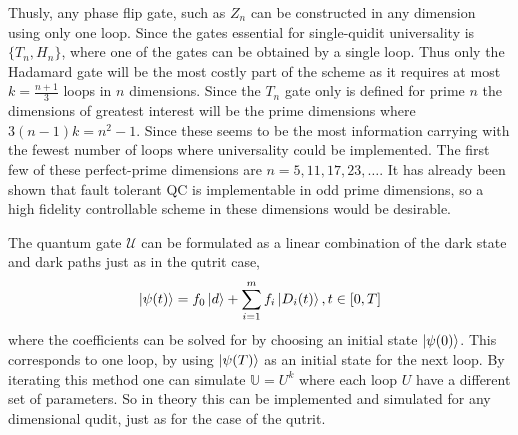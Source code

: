 Thusly, any phase flip gate, such as $Z_n$ can be constructed in any dimension using only one loop. Since the gates essential for single-quidit universality is $\{T_n, H_n\}$, where one of the gates can be obtained by a single loop. Thus only the Hadamard gate will be the most costly part of the scheme as it requires at most $k = \frac{n+1}{3}$ loops in $n$ dimensions. Since the $T_n$ gate only is defined for prime $n$ the dimensions of greatest interest will be the prime dimensions where $3(n-1)k = n^2 -1$. Since these seems to be the most information carrying with the fewest number of loops where universality could be implemented. The first few of these perfect-prime dimensions are $n = 5,11,17,23,\dots$. It has already been shown that fault tolerant QC is implementable in odd prime dimensions\cite{magic-muller}, so a high fidelity controllable scheme in these dimensions would be desirable.



The quantum gate $\mathcal{U}$ can be formulated as a linear combination of the dark state and dark paths just as in the qutrit case,
\begin{equation}
\ket{\psi(t)} = f_0\ket{d} + \sum_{i = 1}^{m}f_i\ket{D_i(t)}, t \in [0,T]
\end{equation}
where the coefficients can be solved for by choosing an initial state $\ket{\psi(0)}$. This corresponds to one loop, by using $\ket{\psi(T)}$ as an initial state for the next loop. By iterating this method one can simulate $\mathbb{U} = U^k$ where each loop $U$ have a different set of parameters. So in theory this can be implemented and simulated for any dimensional qudit, just as for the case of the qutrit. 






